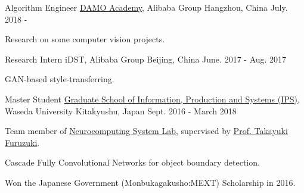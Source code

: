 
\begin{cventries}

  \cventry
    {Algorithm Engineer} %
    {\href{https://damo.alibaba.com}{DAMO Academy}, Alibaba Group} %
    {Hangzhou, China} %
    {July. 2018 -} %
    {
      \begin{cvitems} %
        \item {Research on some computer vision projects.}
      \end{cvitems}
    }

  \cventry
    {Research Intern} %
    {iDST, Alibaba Group} %
    {Beijing, China} %
    {June. 2017 - Aug. 2017} %
    {
      \begin{cvitems} %
        \item {GAN-based style-transferring.}
      \end{cvitems}
    }

  \cventry
    {Master Student} %
    {\href{https://www.waseda.jp/fsci/gips/en/}{Graduate School of Information, Production and Systems (IPS)}, Waseda University} %
    {Kitakyushu, Japan} %
    {Sept. 2016 - March 2018} %
    {
      \begin{cvitems} %
        \item {Team member of \href{http://www.waseda.jp/sem-hflab/nclab/index.html}{Neurocomputing System Lab}, supervised by \href{http://www.f.waseda.jp/jinglu/}{Prof. Takayuki Furuzuki}.}
        \item {Cascade Fully Convolutional Networks for object boundary detection.}
        \item {Won the Japanese Government (Monbukagakusho:MEXT) Scholarship in 2016.}
      \end{cvitems}
    }


\end{cventries}
